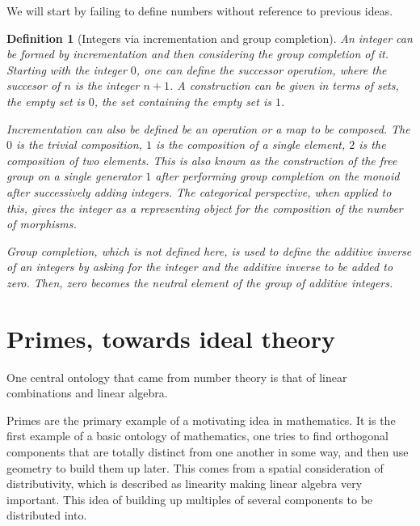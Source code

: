 \documentclass{tufte-book}
\newtheorem{definition}[theorem]{Definition}
\begin{document}
We will start by failing to define numbers without reference to previous ideas.

\begin{definition}[Integers via incrementation and group completion]
  An integer can be formed by incrementation and then considering the group completion of it. Starting with the integer $0$, one can define the successor operation, where the succesor of $n$ is the integer $n + 1$. A construction can be given in terms of sets, the empty set is $0$, the set containing the empty set is $1$. 
  
  Incrementation can also be defined be an operation or a map to be composed. The $0$ is the trivial composition, $1$ is the composition of a single element, $2$ is the composition of two elements. This is also known as the construction of the free group on a single generator $1$ after performing group completion on the monoid after successively adding integers. The categorical perspective, when applied to this, gives the integer as a representing object for the composition of the number of morphisms.

  Group completion, which is not defined here, is used to define the additive inverse of an integers by asking for the integer and the additive inverse to be added to zero. Then, zero becomes the neutral element of the group of additive integers.
\end{definition}

\section{Primes, towards ideal theory}

One central ontology that came from number theory is that of linear combinations and linear algebra.

Primes are the primary example of a motivating idea in mathematics. It is the first example of a basic ontology of mathematics, one tries to find orthogonal components that are totally distinct from one another in some way, and then use geometry to build them up later. This comes from a spatial consideration of distributivity, which is described as linearity making linear algebra very important. This idea of building up multiples of several components to be distributed into.
\end{document}
